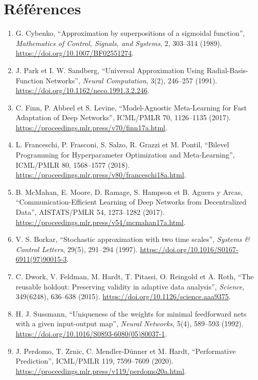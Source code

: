\documentclass[11pt,a4paper]{article}
\begin{document}
\section{Références}
\begin{enumerate}[label={\arabic*.}]
\item G. Cybenko, ``Approximation by superpositions of a sigmoidal function'', \emph{Mathematics of Control, Signals, and Systems}, 2, 303--314 (1989). \url{https://doi.org/10.1007/BF02551274}.
\item J. Park et I. W. Sandberg, ``Universal Approximation Using Radial-Basis-Function Networks'', \emph{Neural Computation}, 3(2), 246--257 (1991). \url{https://doi.org/10.1162/neco.1991.3.2.246}.
\item C. Finn, P. Abbeel et S. Levine, ``Model-Agnostic Meta-Learning for Fast Adaptation of Deep Networks'', ICML/PMLR 70, 1126--1135 (2017). \url{https://proceedings.mlr.press/v70/finn17a.html}.
\item L. Franceschi, P. Frasconi, S. Salzo, R. Grazzi et M. Pontil, ``Bilevel Programming for Hyperparameter Optimization and Meta-Learning'', ICML/PMLR 80, 1568--1577 (2018). \url{https://proceedings.mlr.press/v80/franceschi18a.html}.
\item B. McMahan, E. Moore, D. Ramage, S. Hampson et B. Aguera y Arcas, ``Communication-Efficient Learning of Deep Networks from Decentralized Data'', AISTATS/PMLR 54, 1273--1282 (2017). \url{https://proceedings.mlr.press/v54/mcmahan17a.html}.
\item V. S. Borkar, ``Stochastic approximation with two time scales'', \emph{Systems \& Control Letters}, 29(5), 291--294 (1997). \url{https://doi.org/10.1016/S0167-6911(97)90015-3}.
\item C. Dwork, V. Feldman, M. Hardt, T. Pitassi, O. Reingold et A. Roth, ``The reusable holdout: Preserving validity in adaptive data analysis'', \emph{Science}, 349(6248), 636--638 (2015). \url{https://doi.org/10.1126/science.aaa9375}.
\item H. J. Sussmann, ``Uniqueness of the weights for minimal feedforward nets with a given input-output map'', \emph{Neural Networks}, 5(4), 589--593 (1992). \url{https://doi.org/10.1016/S0893-6080(05)80037-1}.
\item J. Perdomo, T. Zrnic, C. Mendler-Dünner et M. Hardt, ``Performative Prediction'', ICML/PMLR 119, 7599--7609 (2020). \url{https://proceedings.mlr.press/v119/perdomo20a.html}.
\end{enumerate}
\end{document}
